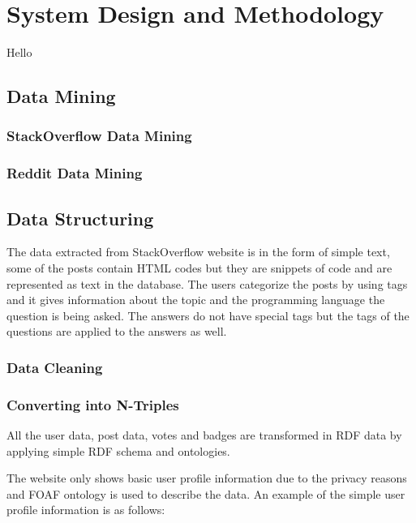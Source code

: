 

\chapter{System Design and Methodology} \label{Chapter:System Design and Methodology}
Hello

\section{Data Mining}
\subsection{StackOverflow Data Mining}
\subsection{Reddit Data Mining}

\section{Data Structuring}

The data extracted from StackOverflow website is in the form of simple text, some of the posts contain HTML codes but they are snippets of code and are represented as text in the database. The users categorize the posts by using tags and it gives information about the topic and the programming language the question is being asked. The answers do not have special tags but the tags of the questions are applied to the answers as well.


\subsection{Data Cleaning}
\subsection{Converting into N-Triples}

All the user data, post data, votes and badges are transformed in RDF data by applying simple RDF schema and ontologies.

The website only shows basic user profile information due to the privacy reasons and FOAF ontology is used to describe the data. An example of the simple user profile information is as follows:

